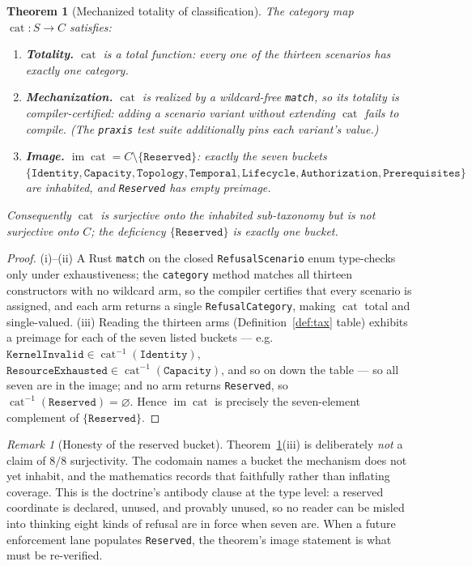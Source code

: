 \documentclass[11pt,oneside]{book}
\theoremstyle{definition}
\theoremstyle{plain}
\newtheorem{theorem}{Theorem}[chapter]
\theoremstyle{remark}
\newtheorem*{remark}{Remark}
\DeclareMathOperator{\im}{im}
\newcommand{\code}[1]{\texttt{#1}}
\newcommand{\Catset}{C}              %
\newcommand{\Scnset}{S}              %
\DeclareMathOperator{\catop}{cat}
\begin{document}
\begin{theorem}[Mechanized totality of classification]\label{thm:total}
The category map $\catop:\Scnset\to\Catset$ satisfies: %
\begin{enumerate}[label=(\roman*),leftmargin=*]
\item \textbf{Totality.} $\catop$ is a total function: every one of the thirteen scenarios has exactly one category. %
\item \textbf{Mechanization.} $\catop$ is realized by a wildcard-free \code{match}, so its totality is compiler-certified: adding a scenario variant without extending $\catop$ fails to compile. (The \code{praxis} test suite additionally pins each variant's value.) %
\item \textbf{Image.} $\im\catop=\Catset\setminus\{\code{Reserved}\}$: exactly the seven buckets $\{\code{Identity},\code{Capacity},\code{Topology},\code{Temporal},\code{Lifecycle}, \code{Authorization},\code{Prerequisites}\}$ are inhabited, and \code{Reserved} has empty preimage. %
\end{enumerate}
Consequently $\catop$ is surjective onto the inhabited sub-taxonomy but is \emph{not} surjective onto $\Catset$; the deficiency $\{\code{Reserved}\}$ is exactly one bucket. %
\end{theorem}

\begin{proof}
(i)--(ii) A Rust \code{match} on the closed \code{RefusalScenario} enum type-checks only under exhaustiveness; the \code{category} method matches all thirteen constructors with no wildcard arm, so the compiler certifies that every scenario is assigned, and each arm returns a single \code{RefusalCategory}, making $\catop$ total and single-valued. %
(iii) Reading the thirteen arms (Definition~\ref{def:tax} table) exhibits a preimage for each of the seven listed buckets --- e.g.\ $\code{KernelInvalid}\in\catop^{-1}(\code{Identity})$, $\code{ResourceExhausted}\in\catop^{-1}(\code{Capacity})$, and so on down the table --- so all seven are in the image; and no arm returns \code{Reserved}, so $\catop^{-1}(\code{Reserved}) =\varnothing$. %
Hence $\im\catop$ is precisely the seven-element complement of $\{\code{Reserved}\}$. %
\end{proof}

\begin{remark}[Honesty of the reserved bucket]
Theorem~\ref{thm:total}(iii) is deliberately \emph{not} a claim of $8/8$ surjectivity. %
The codomain names a bucket the mechanism does not yet inhabit, and the mathematics records that faithfully rather than inflating coverage. %
This is the doctrine's antibody clause at the type level: a reserved coordinate is declared, unused, and provably unused, so no reader can be misled into thinking eight kinds of refusal are in force when seven are. %
When a future enforcement lane populates \code{Reserved}, the theorem's image statement is what must be re-verified. %
\end{remark}
\end{document}
